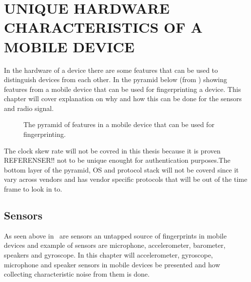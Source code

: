 \chapter{UNIQUE HARDWARE CHARACTERISTICS OF A MOBILE DEVICE}\label{cha:character}
In the hardware of a device there are some features that can be used to distinguish devices from each other. In the pyramid below (from \cite{sensor:acoustic}) showing features from a mobile device that can be used for fingerprinting a device. This chapter will cover explanation on why and how this can be done for the sensors and radio signal.
\begin{figure}[!h]
	
	\caption{\label{fig:pyramid} The pyramid of features in a mobile device that can be used for fingerprinting.}
\end{figure}
The clock skew rate will not be covred in this thesis because it is proven REFERENSER!! not to be unique enought for authentication purposes.The bottom layer of the pyramid, OS and protocol stack will not be coverd since it vary across vendors and has vendor specific protocols that will be out of the time frame to look in to.

\section{Sensors}\label{sec:sensors}
As seen above in~ are sensors an untapped source of fingerprints in mobile devices and example of sensors are microphone, accelerometer, barometer, speakers and gyroscope. In this chapter will accelerometer, gyroscope, microphone and speaker sensors in mobile devices be presented and how collecting characteristic noise from them is done.

